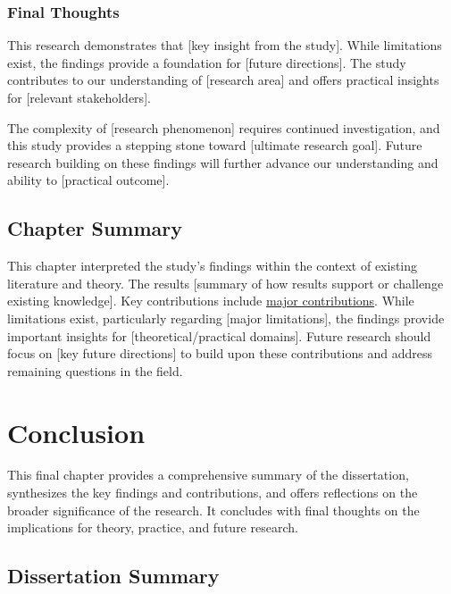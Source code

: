 \documentclass[
  12pt,
  letterpaper,
  12pt,
  letterpaper,
  oneside]{report}
\begin{document}
\subsection{Final Thoughts}\label{final-thoughts}

This research demonstrates that {[}key insight from the study{]}. While
limitations exist, the findings provide a foundation for {[}future
directions{]}. The study contributes to our understanding of {[}research
area{]} and offers practical insights for {[}relevant stakeholders{]}.

The complexity of {[}research phenomenon{]} requires continued
investigation, and this study provides a stepping stone toward
{[}ultimate research goal{]}. Future research building on these findings
will further advance our understanding and ability to {[}practical
outcome{]}.

\section{Chapter Summary}\label{chapter-summary-3}

This chapter interpreted the study's findings within the context of
existing literature and theory. The results {[}summary of how results
support or challenge existing knowledge{]}. Key contributions include
\hyperref[major-contributions]{major contributions}. While limitations
exist, particularly regarding {[}major limitations{]}, the findings
provide important insights for {[}theoretical/practical domains{]}.
Future research should focus on {[}key future directions{]} to build
upon these contributions and address remaining questions in the field.


\chapter{Conclusion}\label{conclusion-1}

This final chapter provides a comprehensive summary of the dissertation,
synthesizes the key findings and contributions, and offers reflections
on the broader significance of the research. It concludes with final
thoughts on the implications for theory, practice, and future research.

\section{Dissertation Summary}\label{dissertation-summary}
\end{document}

